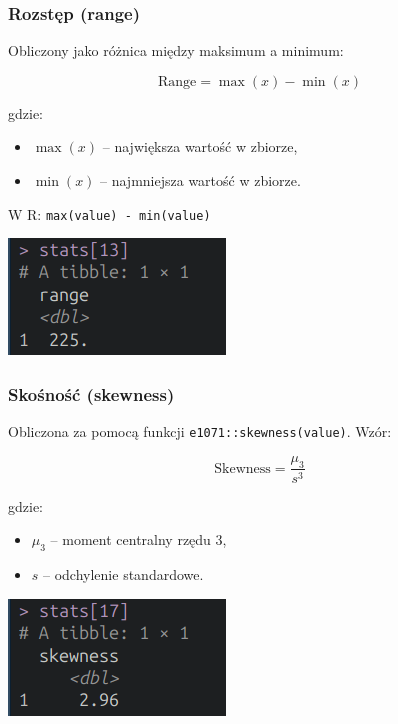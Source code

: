 \documentclass[polish]{article}
\begin{document}
    \newpage

    \subsubsection{Rozstęp (range)}

    Obliczony jako różnica między maksimum a minimum:

    \large
    \[
    \text{Range} = \max(x) - \min(x)
    \]
    \normalsize

    \noindent gdzie:
    \begin{itemize}
    \item \( \max(x) \) -- największa wartość w zbiorze,
    \item \( \min(x) \) -- najmniejsza wartość w zbiorze.
    \end{itemize}

    W R: \texttt{max(value) - min(value)}

    \begin{center}
        \includegraphics{img/range.png}
    \end{center}


    \subsubsection{Skośność (skewness)}

    Obliczona za pomocą funkcji \texttt{e1071::skewness(value)}. Wzór:

    \Large
    \[
    \text{Skewness} = \frac{\mu_3}{s^3}
    \]
    \normalsize

    \noindent gdzie:
    \begin{itemize}
    \item \( \mu_3 \) -- moment centralny rzędu 3,
    \item \( s \) -- odchylenie standardowe.
    \end{itemize}

    \begin{center}
        \includegraphics{img/skewness.png}
    \end{center}
\end{document}
